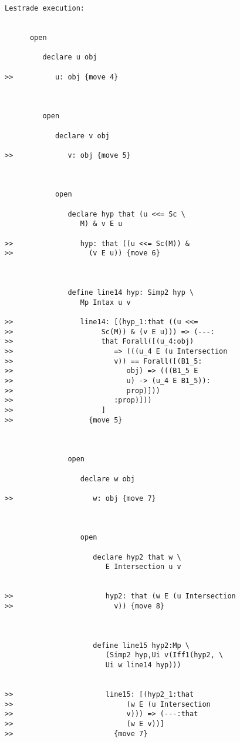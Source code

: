\documentclass[12pt]{article}
\begin{document}
\begin{verbatim}Lestrade execution:


      open

         declare u obj

>>          u: obj {move 4}



         open

            declare v obj

>>             v: obj {move 5}



            open

               declare hyp that (u <<= Sc \
                  M) & v E u

>>                hyp: that ((u <<= Sc(M)) &
>>                  (v E u)) {move 6}



               define line14 hyp: Simp2 hyp \
                  Mp Intax u v

>>                line14: [(hyp_1:that ((u <<=
>>                     Sc(M)) & (v E u))) => (---:
>>                     that Forall([(u_4:obj)
>>                        => (((u_4 E (u Intersection
>>                        v)) == Forall([(B1_5:
>>                           obj) => (((B1_5 E
>>                           u) -> (u_4 E B1_5)):
>>                           prop)]))
>>                        :prop)]))
>>                     ]
>>                  {move 5}



               open

                  declare w obj

>>                   w: obj {move 7}



                  open

                     declare hyp2 that w \
                        E Intersection u v


>>                      hyp2: that (w E (u Intersection
>>                        v)) {move 8}



                     define line15 hyp2:Mp \
                        (Simp2 hyp,Ui v(Iff1(hyp2, \
                        Ui w line14 hyp)))


>>                      line15: [(hyp2_1:that
>>                           (w E (u Intersection
>>                           v))) => (---:that
>>                           (w E v))]
>>                        {move 7}




\end{verbatim}
\end{document}
